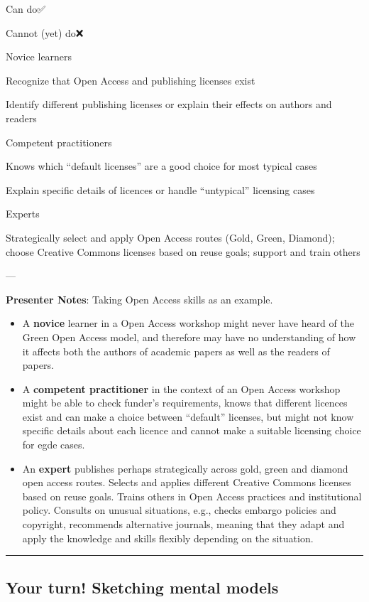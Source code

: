 \documentclass[
  letterpaper,
  DIV=11,
  numbers=noendperiod]{scrartcl}
\begin{document}
Can do✅

Cannot (yet) do❌

Novice learners

Recognize that Open Access and publishing licenses exist

Identify different publishing licenses or explain their effects on
authors and readers

Competent practitioners

Knows which ``default licenses'' are a good choice for most typical
cases

Explain specific details of licences or handle ``untypical'' licensing
cases

Experts

Strategically select and apply Open Access routes (Gold, Green,
Diamond); choose Creative Commons licenses based on reuse goals; support
and train others

---

\textbf{Presenter Notes}: Taking Open Access skills as an example.

\begin{itemize}
\item
  A \textbf{novice} learner in a Open Access workshop might never have
  heard of the Green Open Access model, and therefore may have no
  understanding of how it affects both the authors of academic papers as
  well as the readers of papers.
\item
  A \textbf{competent practitioner} in the context of an Open Access
  workshop might be able to check funder's requirements, knows that
  different licences exist and can make a choice between ``default''
  licenses, but might not know specific details about each licence and
  cannot make a suitable licensing choice for egde cases.
\item
  An \textbf{expert} publishes perhaps strategically across gold, green
  and diamond open access routes. Selects and applies different Creative
  Commons licenses based on reuse goals. Trains others in Open Access
  practices and institutional policy. Consults on unusual situations,
  e.g., checks embargo policies and copyright, recommends alternative
  journals, meaning that they adapt and apply the knowledge and skills
  flexibly depending on the situation.
\end{itemize}

\begin{center}\rule{0.5\linewidth}{0.5pt}\end{center}

\subsection{Your turn! Sketching mental
models}\label{your-turn-sketching-mental-models}
\end{document}
